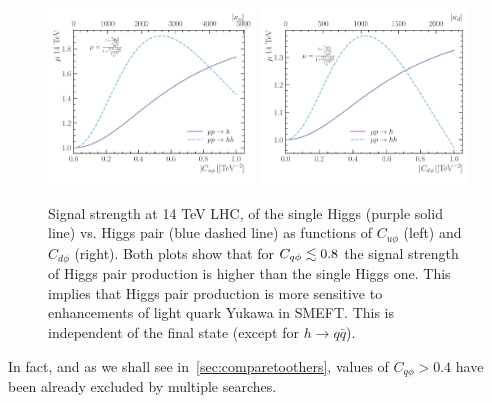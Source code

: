 \begin{figure}[!t]
	\centering
	\includegraphics[width = 0.49\textwidth]{./figures/up-signal-strength.pdf}
	\includegraphics[width = 0.49\textwidth]{./figures/dn-signal-strength}
	\caption{Signal strength at 14 TeV LHC, of the single Higgs (purple solid line) vs. Higgs pair (blue dashed line) as functions of $C_{u\phi}$ (left) and $C_{d \phi}$ (right). Both plots show that for $C_{q \phi} \lesssim 0.8$  the signal strength of Higgs pair production is higher than the single Higgs one. This implies that Higgs pair production is more sensitive to enhancements of light quark Yukawa in SMEFT. This is independent of the final state (except for $ h \to q \bar q$).  }
	\label{signal_strength_hh}
\end{figure}
In fact, and as we shall see in~\autoref{sec:comparetoothers}, values of $C_{q \phi} >0.4$ have been already excluded by multiple searches. 
